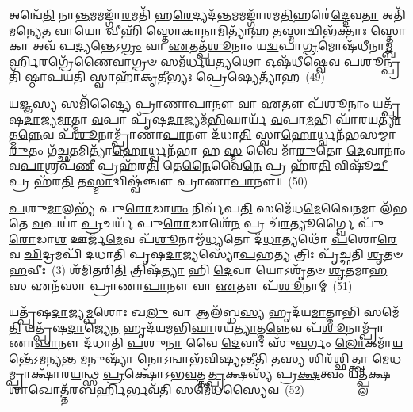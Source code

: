 𑌅𑌨𑍍𑌵𑍇᳴\-\ul{𑌤𑌿} 𑌨𑌾\-\ul{𑌨𑍍𑌤}\-𑌮𑌮𑌙𑍍𑌗𑌾᳴\-\ul{𑌰}\-𑌮𑌤𑌿᳴ 𑌹\-\ul{𑌰𑍇}\-𑌦𑍍𑌯𑌦᳴\-\ul{𑌨𑍍𑌤}\-𑌮𑌮𑌙𑍍𑌗𑌾᳴𑌰𑌮\-\ul{𑌤𑌿}\-𑌹𑌰𑍇॑\-\ul{𑌦𑍍𑌦𑍇}\-𑌵\-\ul{𑌤𑌾} 𑌅𑌤𑌿᳴ 𑌮𑌨𑍍𑌯𑍇\-\ul{𑌤} 𑌵𑌾\-\ul{𑌯𑍋} 𑌵𑍀𑌹𑌿᳴ \ul{𑌸𑍍𑌤𑍋}\-𑌕𑌾\-\ul{𑌨𑌾}\-𑌮𑌿𑌤𑍍𑌯𑌾᳴\-\ul{𑌹} 𑌤\-\ul{𑌸𑍍𑌮𑌾}\-𑌦𑍍𑌵𑌿𑌭᳴𑌕𑍍𑌤𑌾𑌃 \ul{𑌸𑍍𑌤𑍋}\-𑌕𑌾 𑌅𑌵᳴ 𑌪\-\ul{𑌦𑍍𑌯}\-𑌨𑍍𑌤𑍇\-𑌽\-\ul{𑌗𑍍𑌰𑌂} 𑌵𑌾 \ul{𑌏}\-𑌤𑌤𑍍𑌪᳴\-\ul{𑌶𑍂}\-𑌨𑌾𑌂 𑌯\-\ul{𑌦𑍍𑌵}\-𑌪𑌾\-\ul{𑌗𑍍𑌰}\-𑌮𑍋𑌷᳴𑌧𑍀𑌨𑌾\-\ul{𑌮𑍍𑌬}\-𑌰𑍍\mbox{}𑌹𑌿𑌰𑌗𑍍𑌰𑍇᳴\-\ul{𑌣𑍈}\-𑌵𑌾\-\ul{𑌗𑍍𑌰}\-\-\ul{𑍞} 𑌸𑌮᳴𑌰𑍍𑌧\-\ul{𑌯}\-𑌤𑍍𑌯\-\ul{𑌥𑍋} 𑌓𑌷᳴𑌧𑍀\-\ul{𑌷𑍍𑌵𑍇}\-𑌵 \ul{𑌪}\-𑌶𑍂𑌨𑍍𑌪𑍍𑌰𑌤𑌿᳴ 𑌷𑍍𑌠𑌾𑌪𑌯\-\ul{𑌤𑌿} 𑌸𑍍𑌵𑌾𑌹𑌾᳴𑌕𑍃𑌤𑍀\-\ul{𑌭𑍍𑌯𑌃} 𑌪𑍍𑌰𑍇𑌷𑍍𑌯𑍇𑌤𑍍𑌯𑌾᳴𑌹~(49)

\-\ul{𑌯}\-𑌜𑍍𑌞\-\ul{𑌸𑍍𑌯} 𑌸𑌮𑌿᳴𑌷𑍍𑌟𑍍𑌯𑍈 𑌪𑍍𑌰𑌾𑌣𑌾\-\ul{𑌪𑌾}\-𑌨𑍗 𑌵𑌾 \ul{𑌏}\-𑌤𑍗 𑌪᳴\-\ul{𑌶𑍂}\-𑌨𑌾𑌂 𑌯𑌤𑍍𑌪𑍃᳴𑌷\-\ul{𑌦𑌾}\-𑌜𑍍𑌯\-\ul{𑌮𑌾}\-𑌤𑍍𑌮𑌾 \ul{𑌵}\-𑌪𑌾 𑌪𑍃᳴𑌷\-\ul{𑌦𑌾}\-𑌜𑍍𑌯𑌮᳴\-\ul{𑌭𑌿}\-𑌘𑌾𑌰𑍍𑌯᳴ \ul{𑌵}\-𑌪𑌾\-\ul{𑌮}\-𑌭𑌿 𑌘𑌾᳴𑌰𑌯\-\ul{𑌤𑍍𑌯𑌾}\-𑌤𑍍𑌮\-\ul{𑌨𑍍𑌨𑍇}\-𑌵 𑌪᳴\-\ul{𑌶𑍂}\-𑌨𑌾𑌮𑍍𑌪𑍍𑌰𑌾᳴𑌣𑌾\-\ul{𑌪𑌾}\-𑌨𑍗 𑌦᳴𑌧𑌾\-\ul{𑌤𑌿} 𑌸𑍍𑌵𑌾\-\ul{𑌹𑍋}\-𑌰𑍍𑌧𑍍𑌵𑌨᳴𑌭𑌸𑌮𑍍𑌮𑌾\-\ul{𑌰𑍁}\-𑌤𑌂 𑌗᳴𑌚𑍍𑌛\-\ul{𑌤}\-𑌮𑌿𑌤𑍍𑌯𑌾᳴\-\ul{𑌹𑍋}\-𑌰𑍍𑌧𑍍𑌵𑌨᳴𑌭𑌾 𑌹 \ul{𑌸𑍍𑌮} 𑌵𑍈 𑌮𑌾᳴\-\ul{𑌰𑍁}\-𑌤𑍋 \ul{𑌦𑍇}\-𑌵𑌾𑌨𑌾𑌂॑ 𑌵\-\ul{𑌪𑌾}\-𑌶𑍍𑌰𑌪᳴\-\ul{𑌣𑍀} 𑌪𑍍𑌰𑌹᳴𑌰\-\ul{𑌤𑌿} 𑌤𑍇\-\ul{𑌨𑍈}\-𑌵𑍈\-\ul{𑌨𑍇} 𑌪𑍍𑌰 𑌹᳴𑌰\-\ul{𑌤𑌿} 𑌵𑌿𑌷𑍂᳴\-\ul{𑌚𑍀} 𑌪𑍍𑌰 𑌹᳴𑌰\-\ul{𑌤𑌿} 𑌤\-\ul{𑌸𑍍𑌮𑌾}\-𑌦𑍍𑌵𑌿𑌷𑍍𑌵᳴𑌞𑍍𑌚𑍗 𑌪𑍍𑌰𑌾𑌣𑌾\-\ul{𑌪𑌾}\-𑌨𑍗॥~(50)

{\anuvakamend[{𑌸𑍍𑌵𑌧𑌿᳴𑌤𑌿\-\ul{𑌶𑍍𑌚𑍈}\-𑌵𑌾𑌚𑍍𑌛𑌿᳴𑌨𑍍𑌨𑍋 \ul{𑌹}\-𑌵𑍍𑌯𑍇\-\ul{𑌨𑍇}\-𑌷𑍍𑌯𑍇𑌤𑍍𑌯𑌾᳴\-\ul{𑌹} 𑌷𑌟𑍍𑌚᳴𑌤𑍍𑌵𑌾𑌰𑌿𑍞𑌶𑌚𑍍𑌚}]}%

\-\ul{𑌪}\-𑌶𑍁\-\ul{𑌮𑌾}\-𑌲𑌭𑍍𑌯᳴ 𑌪𑍁\-\ul{𑌰𑍋}\-𑌡𑌾\-\ul{𑌶𑌂} 𑌨𑌿𑌰𑍍𑌵᳴𑌪\-\ul{𑌤𑌿} 𑌸𑌮𑍇᳴𑌧\-\ul{𑌮𑍇}\-𑌵𑍈\-\ul{𑌨}\-𑌮𑌾 𑌲᳴𑌭𑌤𑍇 \ul{𑌵}\-𑌪𑌯𑌾॑ \ul{𑌪𑍍𑌰}\-𑌚𑌰𑍍𑌯᳴ 𑌪𑍁\-\ul{𑌰𑍋}\-𑌡𑌾𑌶𑍇᳴\-\ul{𑌨} 𑌪𑍍𑌰 𑌚᳴\-\ul{𑌰}\-𑌤𑍍𑌯𑍂𑌰𑍍𑌗𑍍𑌵𑍈 𑌪𑍁᳴\-\ul{𑌰𑍋}\-𑌡𑌾\-\ul{𑌶} 𑌊𑌰𑍍𑌜᳴\-\ul{𑌮𑍇}\-𑌵 𑌪᳴\-\ul{𑌶𑍂}\-𑌨𑌾𑌮𑍍𑌮᳴\-\ul{𑌧𑍍𑌯}\-𑌤𑍋 𑌦᳴\-\ul{𑌧𑌾}\-𑌤𑍍𑌯𑌥𑍋᳴ \ul{𑌪}\-𑌶𑍋\-\ul{𑌰𑍇}\-𑌵 \ul{𑌛𑌿}\-𑌦𑍍𑌰𑌮𑌪𑌿᳴ 𑌦𑌧𑌾𑌤𑌿 𑌪𑍃𑌷\-\ul{𑌦𑌾}\-𑌜𑍍𑌯𑌸𑍍𑌯𑍋᳴\-\ul{𑌪}\-𑌹\-\ul{𑌤𑍍𑌯} 𑌤𑍍𑌰𑌿𑌃 𑌪𑍃᳴𑌚𑍍𑌛𑌤𑌿 \ul{𑌶𑍃}\-𑌤𑍞 \ul{𑌹}\-𑌵𑍀𑌃~(3) 𑌶᳴𑌮𑌿\-\ul{𑌤}\-𑌰𑌿\-\ul{𑌤𑌿} 𑌤𑍍𑌰𑌿𑌷᳴\-\ul{𑌤𑍍𑌯𑌾} 𑌹𑌿 \ul{𑌦𑍇}\-𑌵𑌾 𑌯𑍋\-𑌽𑌶𑍃᳴𑌤𑍞 \ul{𑌶𑍃}\-𑌤𑌮𑌾\-\ul{𑌹} 𑌸 𑌏𑌨᳴𑌸𑌾 𑌪𑍍𑌰𑌾𑌣𑌾\-\ul{𑌪𑌾}\-𑌨𑍗 𑌵𑌾 \ul{𑌏}\-𑌤𑍗 𑌪᳴\-\ul{𑌶𑍂}\-𑌨𑌾𑌮𑍍~(51)

𑌯𑌤𑍍𑌪𑍃᳴𑌷\-\ul{𑌦𑌾}\-𑌜𑍍𑌯\-\ul{𑌮𑍍𑌪}\-𑌶𑍋𑌃 𑌖\-\ul{𑌲𑍁} 𑌵𑌾 𑌆𑌲᳴𑌬𑍍𑌧\-\ul{𑌸𑍍𑌯} 𑌹𑍃𑌦᳴𑌯\-\ul{𑌮𑌾}\-𑌤𑍍𑌮𑌾𑌭𑌿 𑌸𑌮𑍇᳴\-\ul{𑌤𑌿} 𑌯𑌤𑍍𑌪𑍃᳴𑌷\-\ul{𑌦𑌾}\-𑌜𑍍𑌯𑍇\-\ul{𑌨} 𑌹𑍃𑌦᳴𑌯𑌮𑌭𑌿\-\ul{𑌘𑌾}\-𑌰𑌯᳴\-\ul{𑌤𑍍𑌯𑌾}\-𑌤𑍍𑌮\-\ul{𑌨𑍍𑌨𑍇}\-𑌵 𑌪᳴\-\ul{𑌶𑍂}\-𑌨𑌾𑌮𑍍𑌪𑍍𑌰𑌾᳴𑌣𑌾\-\ul{𑌪𑌾}\-𑌨𑍗 𑌦᳴𑌧𑌾𑌤𑌿 \ul{𑌪}\-𑌶𑍁\-\ul{𑌨𑌾} 𑌵𑍈 \ul{𑌦𑍇}\-𑌵𑌾𑌃 𑌸𑍁᳴\-\ul{𑌵}\-𑌰𑍍𑌗𑌂 \ul{𑌲𑍋}\-𑌕𑌮𑌾᳴\-\ul{𑌯}\-𑌨𑍍𑌤𑍇᳴\-𑌽𑌮𑌨𑍍𑌯𑌨𑍍𑌤 𑌮\-\ul{𑌨𑍁}\-𑌷𑍍𑌯𑌾᳴ \ul{𑌨𑍋}\-\-𑌽𑌨𑍍𑌵𑌾𑌭᳴𑌵𑌿\-\ul{𑌷𑍍𑌯}\-𑌨𑍍𑌤𑍀\-\ul{𑌤𑌿} 𑌤\-\ul{𑌸𑍍𑌯} 𑌶𑌿𑌰᳴\-\ul{𑌶𑍍𑌛𑌿}\-𑌤𑍍𑌤𑍍𑌵𑌾 𑌮𑍇\-\ul{𑌧}\-𑌮𑍍𑌪𑍍𑌰𑌾𑌕𑍍𑌷𑌾᳴𑌰\-\ul{𑌯}\-𑌨𑍍𑌥𑍍𑌸 \ul{𑌪𑍍𑌰}\-𑌕𑍍𑌷𑍋᳴\-𑌽𑌭\-\ul{𑌵}\-𑌤𑍍𑌤\-\ul{𑌤𑍍𑌪𑍍𑌰}\-𑌕𑍍𑌷𑌸𑍍𑌯᳴ 𑌪𑍍𑌰\-\ul{𑌕𑍍𑌷}\-𑌤𑍍𑌵𑌂 𑌯𑌤𑍍𑌪𑍍𑌲᳴𑌕𑍍𑌷\-\ul{𑌶𑌾}\-𑌖𑍋𑌤𑍍𑌤᳴𑌰\-\ul{𑌬}\-𑌰𑍍\mbox{}𑌹𑌿𑌰𑍍𑌭𑌵᳴\-\ul{𑌤𑌿} 𑌸𑌮𑍇᳴𑌧\-\ul{𑌸𑍍𑌯𑍈}\-𑌵~(52)

